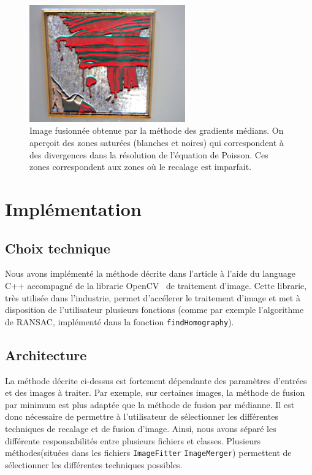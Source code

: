 \documentclass[12pt,a4paper]{article}
\begin{document}
\begin{figure}
\includegraphics[width=0.6\textwidth]{Fig/poisson.png}
\caption{Image fusionnée obtenue par la méthode des gradients médians. On aperçoit des zones saturées (blanches et noires) qui correspondent à des divergences dans la résolution de l'équation de Poisson. Ces zones correspondent aux zones où le recalage est imparfait.}
\label{poissonfig}
\end{figure}
\section{Implémentation}

\subsection{Choix technique}
Nous avons implémenté la méthode décrite dans l'article à l'aide du language C++ accompagné de la librarie OpenCV~\citep{opencv_library} de traitement d'image. Cette librarie, très utilisée dans l'industrie, permet d'accélerer le traitement d'image et met à disposition de l'utilisateur plusieurs fonctions (comme par exemple l'algorithme de RANSAC, implémenté dans la fonction \texttt{findHomography}).

\subsection{Architecture}
La méthode décrite ci-dessus est fortement dépendante des paramètres d'entrées et des images à traiter. Par exemple, sur certaines images, la méthode de fusion par minimum est plus adaptée que la méthode de fusion par médianne. Il est donc nécessaire de permettre à l'utilisateur de sélectionner les différentes techniques de recalage et de fusion d'image. Ainsi, nous avons séparé les différente responsabilités entre plusieurs fichiers et classes. Plusieurs méthodes(situées dans les fichiers \texttt{ImageFitter} \texttt{ImageMerger}) permettent de sélectionner les différentes techniques possibles. 
\end{document}
